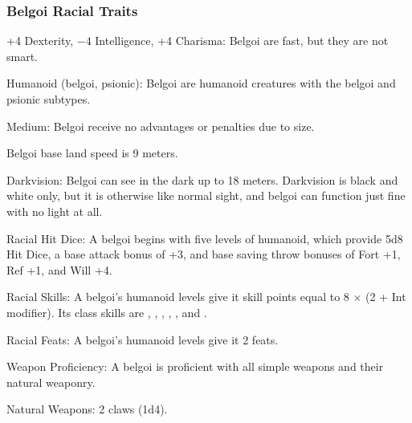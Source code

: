 \subsubsection{Belgoi Racial Traits}
\begin{itemize*}
	\item +4 Dexterity, $-4$ Intelligence, +4 Charisma: Belgoi are fast, but they are not smart.
    \item Humanoid (belgoi, psionic): Belgoi are humanoid creatures with the belgoi and psionic subtypes.
	\item Medium: Belgoi receive no advantages or penalties due to size.
    \item Belgoi base land speed is 9 meters.

    \item Darkvision: Belgoi can see in the dark up to 18 meters. Darkvision is black and white only, but it is otherwise like normal sight, and belgoi can function just fine with no light at all.

    \item Racial Hit Dice: A belgoi begins with five levels of humanoid, which provide 5d8 Hit Dice, a base attack bonus of +3, and base saving throw bonuses of Fort +1, Ref +1, and Will +4.
    \item Racial Skills: A belgoi's humanoid levels give it skill points equal to 8 $\times$ (2 + Int modifier). Its class skills are , , , , , and .
    \item Racial Feats: A belgoi's humanoid levels give it 2 feats.
    \item Weapon Proficiency: A belgoi is proficient with all simple weapons and their natural weaponry.

    \item Natural Weapons: 2 claws (1d4).


\end{itemize*}
